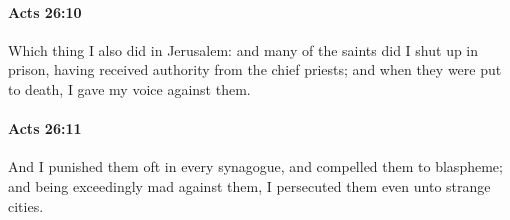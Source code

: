 		\paragraph{Acts 26:10} %
			\label{ACTS-26-10}

			Which thing I also did in Jerusalem: and many of the saints did I shut up in prison, having received authority from the chief priests; and when they were put to death, I gave my voice against them.

			\begin{framed}
			\scriptsize
				\begin{compactdesc}
					\item[SBLG] 
				\end{compactdesc}
			\end{framed}

		\paragraph{Acts 26:11} %
			\label{ACTS-26-11}

			And I punished them oft in every synagogue, and compelled them to blaspheme; and being exceedingly mad against them, I persecuted them even unto strange cities.

